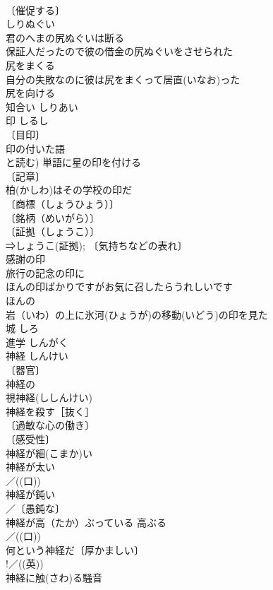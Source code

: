\documentclass[8pt]{extreport}
\begin{document}
\begin{CJK}{UTF8}{min}
\\	〔催促する〕
\\	しりぬぐい　
\\	君のへまの尻ぬぐいは断る 
\\	保証人だったので彼の借金の尻ぬぐいをさせられた 
\\	尻をまくる 
\\	自分の失敗なのに彼は尻をまくって居直(いなお)った 
\\	尻を向ける 
\\	知合い	しりあい	
\\	印	しるし	
\\	〔目印〕
\\	印の付いた語 
\\	と読む) 単語に星の印を付ける 
\\	〔記章〕
\\	柏(かしわ)はその学校の印だ 
\\	〔商標（しょうひょう）〕
\\	〔銘柄（めいがら）〕
\\	〔証拠（しょうこ）〕
\\	⇒しょうこ(証拠); 〔気持ちなどの表れ〕
\\	感謝の印 
\\	旅行の記念の印に 
\\	ほんの印ばかりですがお気に召したらうれしいです 
\\	ほんの　
\\	岩（いわ）の上に氷河(ひょうが)の移動(いどう)の印を見た 
\\	城	しろ	
\\	進学	しんがく	
\\	神経	しんけい	
\\	〔器官〕
\\	神経の 
\\	視神経(ししんけい) 
\\	神経を殺す［抜く］ 
\\	〔過敏な心の働き〕
\\	〔感受性〕
\\	神経が細(こまか)い 
\\	神経が太い 
\\	／((口)) 
\\	神経が鈍い 
\\	／〔愚鈍な〕
\\	神経が高（たか）ぶっている 高ぶる　
\\	／((口)) 
\\	何という神経だ〔厚かましい〕 
\\	!／((英)) 
\\	神経に触(さわ)る騒音 

\end{CJK}
\end{document}
